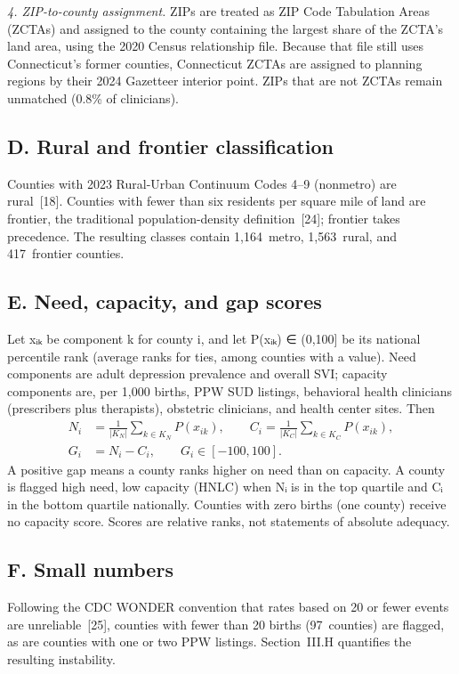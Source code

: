 \documentclass{article}
\begin{document}
\textit{4. ZIP-to-county assignment.} 
ZIPs are treated as ZIP Code Tabulation Areas (ZCTAs) and assigned to the county containing the largest share of the ZCTA's land area, using the 2020 Census relationship file. Because that file still uses Connecticut's former counties, Connecticut ZCTAs are assigned to planning regions by their 2024 Gazetteer interior point. ZIPs that are not ZCTAs remain unmatched (0.8\% of clinicians).

\subsection*{D. Rural and frontier classification}
Counties with 2023 Rural-Urban Continuum Codes 4--9 (nonmetro) are rural~[18]. Counties with fewer than six residents per square mile of land are frontier, the traditional population-density definition~[24]; frontier takes precedence. The resulting classes contain 1,164\ metro, 1,563\ rural, and 417\ frontier counties.

\subsection*{E. Need, capacity, and gap scores}
Let xᵢₖ be component k for county i, and let P(xᵢₖ) ∈ (0,100] be its national percentile rank (average ranks for ties, among counties with a value). Need components are adult depression prevalence and overall SVI; capacity components are, per 1,000 births, PPW SUD listings, behavioral health clinicians (prescribers plus therapists), obstetric clinicians, and health center sites. Then
\begin{align}
N_i &= \frac{1}{|K_N|}\sum_{k\in K_N} P(x_{ik}), \qquad C_i = \frac{1}{|K_C|}\sum_{k\in K_C} P(x_{ik}),\\
G_i &= N_i - C_i,\qquad G_i\in[-100,100].
\end{align}
A positive gap means a county ranks higher on need than on capacity. A county is flagged high need, low capacity (HNLC) when Nᵢ is in the top quartile and Cᵢ in the bottom quartile nationally. Counties with zero births (one county) receive no capacity score. Scores are relative ranks, not statements of absolute adequacy.

\subsection*{F. Small numbers}
Following the CDC WONDER convention that rates based on 20 or fewer events are unreliable~[25], counties with fewer than 20 births (97\ counties) are flagged, as are counties with one or two PPW listings. Section~III.H quantifies the resulting instability.
\end{document}
